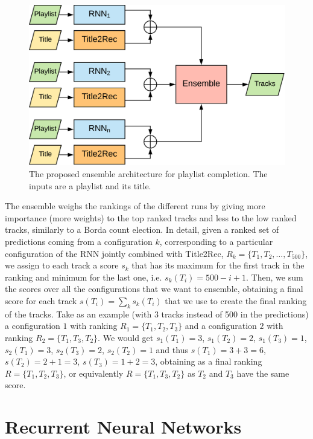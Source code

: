 \begin{figure}
\centering
\includegraphics[width=\textwidth, width=0.75\textwidth]{ensemble}
\caption[Ensemble architecture for playlist completion]{The proposed ensemble architecture for playlist completion. The inputs are a playlist and its title.}
\label{rnn:fig:ensemble}
\end{figure}

The ensemble weighs the rankings of the different runs by giving more importance (more weights) to the top ranked tracks and less to the low ranked tracks, similarly to a Borda count election. In detail, given a ranked set of predictions coming from a configuration $k$, corresponding to a particular configuration of the RNN jointly combined with Title2Rec, $R_k = \{T_1, T_2, \dots, T_{500}\}$, we assign to each track a score $s_k$ that has its maximum for the first track in the ranking and minimum for the last one, i.e. $s_k(T_i) = 500 - i + 1$. Then, we sum the scores over all the configurations that we want to ensemble, obtaining a final score for each track $s(T_i) = \sum_{k} s_k(T_i)$ that we use to create the final ranking of the tracks. Take as an example (with 3 tracks instead of 500 in the predictions) a configuration $1$ with ranking $R_1 = \{T_1, T_2, T_3\}$ and a configuration $2$ with ranking $R_2 = \{T_1, T_3, T_2\}$. We would get $s_1(T_1) =  3$, $s_1(T_2) = 2$, $s_1(T_3) = 1$, $s_2(T_1)=3$, $s_2(T_3) = 2$, $s_2(T_2)=1$ and thus $s(T_1) = 3+3= 6$, $s(T_2)= 2+1=3$, $s(T_3)=1+2=3$, obtaining as a final ranking $R = \{T_1, T_2, T_3\}$, or equivalently $R = \{T_1, T_3, T_2\}$ as $T_2$ and $T_3$ have the same score.

\section{Recurrent Neural Networks}
\label{rnn:sec:rnn}

